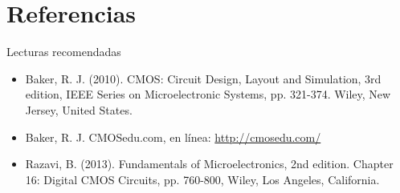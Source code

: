 \documentclass[aspectratio=169,t]{beamer}
\begin{document}
\section{Referencias}
\begin{frame}{Lecturas recomendadas}

\begin{itemize}
    \item Baker, R. J. (2010). CMOS: Circuit Design, Layout and Simulation, 3rd edition, IEEE Series on Microelectronic Systems, pp. 321-374. Wiley, New Jersey, United States.
    \item Baker, R. J. CMOSedu.com, en línea: \url{http://cmosedu.com/}
    \item Razavi, B. (2013). Fundamentals of Microelectronics, 2nd edition. Chapter 16: Digital CMOS Circuits, pp. 760-800, Wiley, Los Angeles, California.
\end{itemize}

\end{frame}
\end{document}
